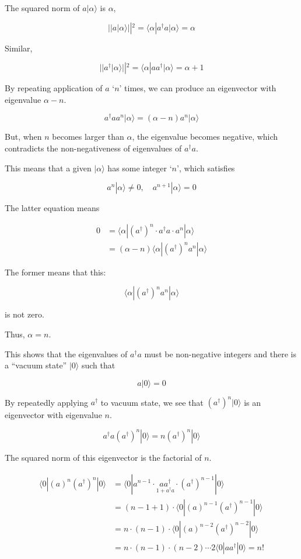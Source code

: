 The squared norm of $a|\alpha\rangle$ is $\alpha$,

\[||a|\alpha\rangle||^2 = \langle\alpha|a^{\dagger}a|\alpha\rangle = \alpha \]

Similar,

\[||a^{\dagger}|\alpha\rangle||^2 = \langle\alpha|aa^{\dagger}|\alpha\rangle = \alpha + 1 \]

By repeating application of $a$ `$n$' times, we can produce an eigenvector with eigenvalue $\alpha - n$.

\[a^{\dagger}a a^n|\alpha\rangle = (\alpha - n)a^n|\alpha\rangle \]

But, when $n$ becomes larger than $\alpha$, the eigenvalue becomes negative, which contradicts the non-negativeness of eigenvalues of $a^{\dagger}a$.

This means that a given $|\alpha\rangle$ has some integer `$n$', which satisfies

\[a^n|\alpha\rangle \neq 0,\quad a^{n+1}|\alpha\rangle = 0 \]

The latter equation means

\[\begin{split}
0 &= \langle\alpha|(a^{\dagger})^n \cdot a^{\dagger}a\cdot a^n|\alpha\rangle\\
&=(\alpha - n)\langle\alpha|(a^{\dagger})^n a^n|\alpha\rangle
\end{split} \]

The former means that this:

\[\langle\alpha|(a^{\dagger})^n a^n|\alpha\rangle \]

is not zero.

Thus, $\alpha = n$.

This shows that the eigenvalues of $a^{\dagger}a$ must be non-negative integers and there is a ``vacuum state'' $|0\rangle$ such that

\[a|0\rangle = 0 \]

By repeatedly applying $a^{\dagger}$ to vacuum state, we see that $(a^{\dagger})^n|0\rangle$ is an eigenvector with eigenvalue $n$.

\[a^{\dagger}a(a^{\dagger})^n|0\rangle = n(a^{\dagger})^n|0\rangle \]

The squared norm of this eigenvector is the factorial of $n$.

\[\begin{split}
\langle 0|(a)^n(a^{\dagger})^n|0\rangle &=  \langle 0|a^{n-1}\cdot \underset{1+a^{\dagger}a}{aa^{\dagger}}\cdot(a^{\dagger})^{n-1}|0\rangle\\
&= (n-1+1)\cdot\langle 0|(a)^{n-1}(a^{\dagger})^{n-1}|0\rangle\\
&= n\cdot(n-1)\cdot\langle 0|(a)^{n-2}(a^{\dagger})^{n-2}|0\rangle\\
&= n\cdot(n-1)\cdot(n-2)\cdots 2 \langle 0|aa^{\dagger}|0\rangle = n!
\end{split}\]

